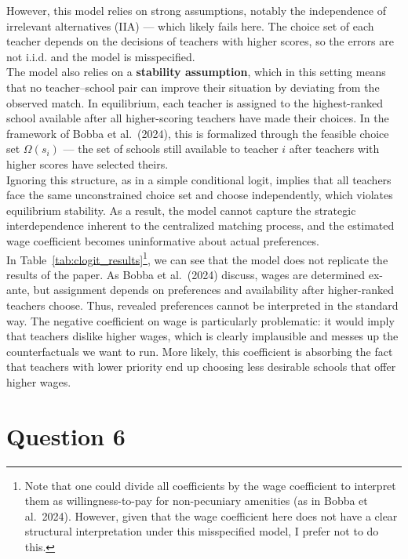 \documentclass{article}
\begin{document}
However, this model relies on strong assumptions, notably the independence of irrelevant alternatives (IIA) — which likely fails here. The choice set of each teacher depends on the decisions of teachers with higher scores, so the errors are not i.i.d. and the model is misspecified. \\

The model also relies on a \textbf{stability assumption}, which in this setting means that no teacher--school pair can improve their situation by deviating from the observed match. In equilibrium, each teacher is assigned to the highest-ranked school available after all higher-scoring teachers have made their choices. In the framework of Bobba et al.\ (2024), this is formalized through the feasible choice set $\Omega(s_i)$ — the set of schools still available to teacher $i$ after teachers with higher scores have selected theirs. \\

Ignoring this structure, as in a simple conditional logit, implies that all teachers face the same unconstrained choice set and choose independently, which violates equilibrium stability. As a result, the model cannot capture the strategic interdependence inherent to the centralized matching process, and the estimated wage coefficient becomes uninformative about actual preferences. \\

In Table~\ref{tab:clogit_results}\footnote{
Note that one could divide all coefficients by the wage coefficient to interpret them as willingness-to-pay for non-pecuniary amenities (as in Bobba et al.\ 2024). However, given that the wage coefficient here does not have a clear structural interpretation under this misspecified model, I prefer not to do this.
}, we can see that the model does not replicate the results of the paper. As Bobba et al.\ (2024) discuss, wages are determined ex-ante, but assignment depends on preferences and availability after higher-ranked teachers choose. Thus, revealed preferences cannot be interpreted in the standard way. The negative coefficient on wage is particularly problematic: it would imply that teachers dislike higher wages, which is clearly implausible and messes up the counterfactuals we want to run. More likely, this coefficient is absorbing the fact that teachers with lower priority end up choosing less desirable schools that offer higher wages.



\section*{Question 6}
\end{document}
